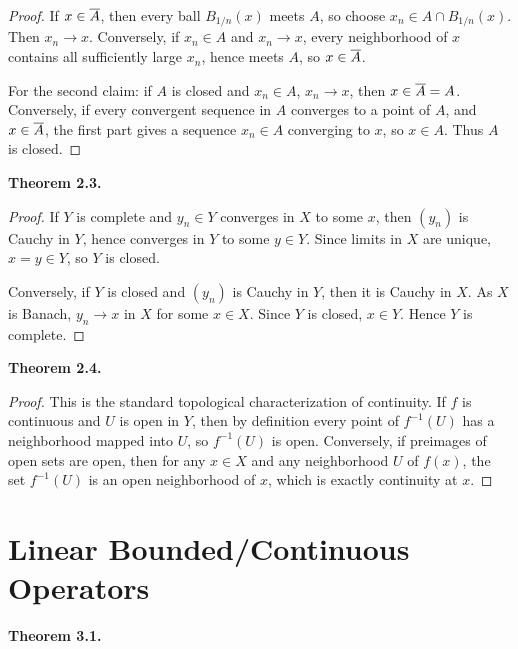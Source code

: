\documentclass[11pt]{article}
\newenvironment{theoremstmt}[1]{%
  \par\medskip\noindent\textbf{Theorem #1. }\itshape
}{\par\medskip}
\begin{document}
\begin{proof}
If $x\in\overline{A}$, then every ball $B_{1/n}(x)$ meets $A$, so choose $x_n\in A\cap B_{1/n}(x)$. Then $x_n\to x$. Conversely, if $x_n\in A$ and $x_n\to x$, every neighborhood of $x$ contains all sufficiently large $x_n$, hence meets $A$, so $x\in\overline{A}$.

For the second claim: if $A$ is closed and $x_n\in A$, $x_n\to x$, then $x\in\overline{A}=A$. Conversely, if every convergent sequence in $A$ converges to a point of $A$, and $x\in\overline{A}$, the first part gives a sequence $x_n\in A$ converging to $x$, so $x\in A$. Thus $A$ is closed.
\end{proof}

\begin{theoremstmt}{2.3}
\thmSubspaceCompleteIffClosed
\end{theoremstmt}

\begin{proof}
If $Y$ is complete and $y_n\in Y$ converges in $X$ to some $x$, then $(y_n)$ is Cauchy in $Y$, hence converges in $Y$ to some $y\in Y$. Since limits in $X$ are unique, $x=y\in Y$, so $Y$ is closed.

Conversely, if $Y$ is closed and $(y_n)$ is Cauchy in $Y$, then it is Cauchy in $X$. As $X$ is Banach, $y_n\to x$ in $X$ for some $x\in X$. Since $Y$ is closed, $x\in Y$. Hence $Y$ is complete.
\end{proof}

\begin{theoremstmt}{2.4}
\thmContinuityPreimages
\end{theoremstmt}

\begin{proof}
This is the standard topological characterization of continuity. If $f$ is continuous and $U$ is open in $Y$, then by definition every point of $f^{-1}(U)$ has a neighborhood mapped into $U$, so $f^{-1}(U)$ is open. Conversely, if preimages of open sets are open, then for any $x\in X$ and any neighborhood $U$ of $f(x)$, the set $f^{-1}(U)$ is an open neighborhood of $x$, which is exactly continuity at $x$.
\end{proof}

\section{Linear Bounded/Continuous Operators}

\begin{theoremstmt}{3.1}
\thmOperatorNorm
\end{theoremstmt}
\end{document}
